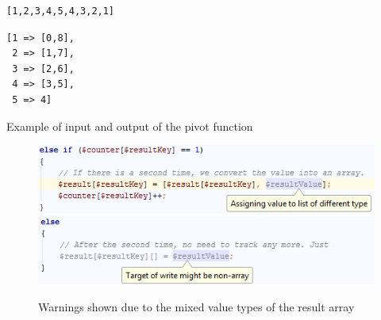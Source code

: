 \begin{program}
\begin{lstlisting}
[1,2,3,4,5,4,3,2,1]
\end{lstlisting}

\begin{lstlisting}
[1 => [0,8],
 2 => [1,7],
 3 => [2,6],
 4 => [3,5],
 5 => 4]
\end{lstlisting}

\caption{Example of input and output of the pivot function}
\label{lst:pivotExample}
\end{program}

\begin{figure}[htbp]
\centering
\includegraphics[scale=0.6]{chapters/caseStudy/pivotWarning1}
\includegraphics[scale=0.6]{chapters/caseStudy/pivotWarning2}
\caption{Warnings shown due to the mixed value types of the result array}
\label{fig:pivotScreenshot}
\end{figure}

